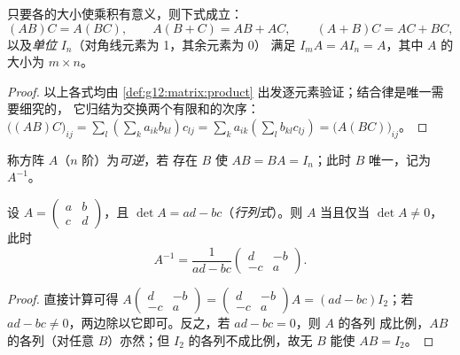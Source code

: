 \begin{proposition}[矩阵代数的运算规则]\label{prop:g12:matrix:rules}
只要各的大小使乘积有意义，则下式成立：
\[
(AB)C = A(BC), \qquad A(B + C) = AB + AC, \qquad (A+B)C = AC + BC,
\]
以及\emph{单位} $I_n$（对角线元素为 1，其余元素为 0）
满足 $I_m A = A I_n = A$，其中 $A$ 的大小为 $m \times n$。
\end{proposition}

\begin{proof}
以上各式均由
\cref{def:g12:matrix:product} 出发逐元素验证；结合律是唯一需要细究的，
它归结为交换两个有限和的次序：
$\bigl((AB)C\bigr)_{ij} = \sum_l \left(\sum_k a_{ik}b_{kl}\right) c_{lj}
= \sum_k a_{ik} \left(\sum_l b_{kl} c_{lj}\right)
= \bigl(A(BC)\bigr)_{ij}$。
\end{proof}

\begin{definition}[逆矩阵]\label{def:g12:matrix:inverse}
称方阵 $A$（$n$ 阶）为\emph{可逆}，若
存在 $B$ 使 $AB = BA = I_n$；此时 $B$ 唯一，记为
$A^{-1}$。
\end{definition}

\begin{proposition}\label{prop:g12:matrix:inverse2x2}
设 $A = \begin{pmatrix} a & b\\ c & d\end{pmatrix}$，且
$\det A = ad - bc$（\emph{行列式}）。则 $A$
当且仅当 $\det A \neq 0$，此时
\[
A^{-1} = \frac{1}{ad - bc}\begin{pmatrix} d & -b\\ -c & a\end{pmatrix}.
\]
\end{proposition}

\begin{proof}
直接计算可得
$A \begin{pmatrix} d & -b\\ -c & a\end{pmatrix}
= \begin{pmatrix} d & -b\\ -c & a\end{pmatrix} A = (ad - bc) I_2$；若
$ad - bc \neq 0$，两边除以它即可。反之，若 $ad - bc = 0$，则 $A$ 的各列
成比例，$AB$ 的各列（对任意 $B$）亦然；但
$I_2$ 的各列不成比例，故无 $B$ 能使 $AB = I_2$。
\end{proof}

